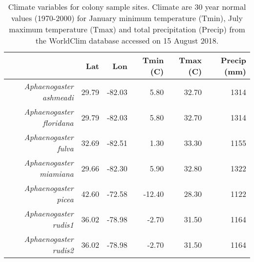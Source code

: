 \begin{table}[ht]
\centering
\begin{tabular}{rrrrrr}
  \hline
 & Lat & Lon & Tmin (C) & Tmax (C) & Precip (mm) \\ 
  \hline
{\emph{Aphaenogaster ashmeadi}} & 29.79 & -82.03 & 5.80 & 32.70 & 1314 \\ 
  {\emph{Aphaenogaster floridana}} & 29.79 & -82.03 & 5.80 & 32.70 & 1314 \\ 
  {\emph{Aphaenogaster fulva}} & 32.69 & -82.51 & 1.30 & 33.30 & 1155 \\ 
  {\emph{Aphaenogaster miamiana}} & 29.66 & -82.30 & 5.90 & 32.80 & 1322 \\ 
  {\emph{Aphaenogaster picea}} & 42.60 & -72.58 & -12.40 & 28.30 & 1122 \\ 
  {\emph{Aphaenogaster rudis1}} & 36.02 & -78.98 & -2.70 & 31.50 & 1164 \\ 
  {\emph{Aphaenogaster rudis2}} & 36.02 & -78.98 & -2.70 & 31.50 & 1164 \\ 
   \hline
\end{tabular}
\caption{Climate variables for colony sample sites. Climate are 30 year normal values (1970-2000) for January minimum temperature (Tmin), July maximum temperature (Tmax) and total precipitation (Precip) from the WorldClim database accessed on 15 August 2018.} 
\label{tab:climate}
\end{table}
